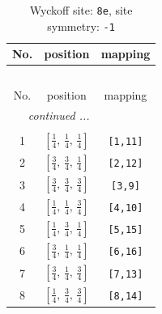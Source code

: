 \documentclass[fleqn,8pt]{jsarticle}
\begin{document}
\renewcommand{\arraystretch}{1.2}
\begin{longtable}{ccc}
\caption{Wyckoff site: {\tt 8e}, site symmetry: {\tt -1}}
 \\
 \hline \hline
No. & position & mapping \\ \hline \endfirsthead

\multicolumn{2}{l}{\tablename\ \thetable{}} \\
 \hline \hline
No. & position & mapping \\ \hline \endhead

 \hline \hline
\multicolumn{2}{r}{\footnotesize\it continued ...} \\ \endfoot

 \hline \hline
\multicolumn{2}{r}{} \\ \endlastfoot

1 & $\left[ \frac{1}{4},\, \frac{1}{4},\, \frac{1}{4} \right]$ & {\tt [1,11]} \\ \hline
2 & $\left[ \frac{3}{4},\, \frac{3}{4},\, \frac{1}{4} \right]$ & {\tt [2,12]} \\ \hline
3 & $\left[ \frac{3}{4},\, \frac{3}{4},\, \frac{3}{4} \right]$ & {\tt [3,9]} \\ \hline
4 & $\left[ \frac{1}{4},\, \frac{1}{4},\, \frac{3}{4} \right]$ & {\tt [4,10]} \\ \hline
5 & $\left[ \frac{1}{4},\, \frac{3}{4},\, \frac{1}{4} \right]$ & {\tt [5,15]} \\ \hline
6 & $\left[ \frac{3}{4},\, \frac{1}{4},\, \frac{1}{4} \right]$ & {\tt [6,16]} \\ \hline
7 & $\left[ \frac{3}{4},\, \frac{1}{4},\, \frac{3}{4} \right]$ & {\tt [7,13]} \\ \hline
8 & $\left[ \frac{1}{4},\, \frac{3}{4},\, \frac{3}{4} \right]$ & {\tt [8,14]} \\
\end{longtable}
\renewcommand{\arraystretch}{1.2}
\end{document}
